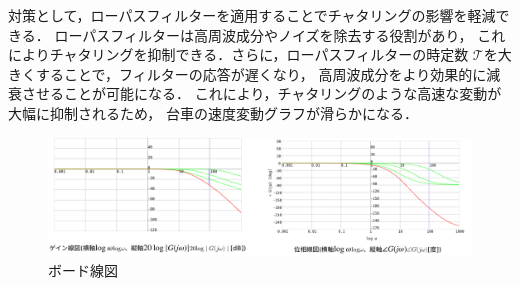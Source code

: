対策として，ローパスフィルターを適用することでチャタリングの影響を軽減できる．
ローパスフィルターは高周波成分やノイズを除去する役割があり，
これによりチャタリングを抑制できる．さらに，ローパスフィルターの時定数 
\(\mathcal{T}\)を大きくすることで，フィルターの応答が遅くなり，
高周波成分をより効果的に減衰させることが可能になる．
これにより，チャタリングのような高速な変動が大幅に抑制されるため，
台車の速度変動グラフが滑らかになる．

\begin{figure}[h]
  \centering
  \includegraphics[scale=0.65]{sozai/4.pdf}
  \caption{ボード線図}
\end{figure}
